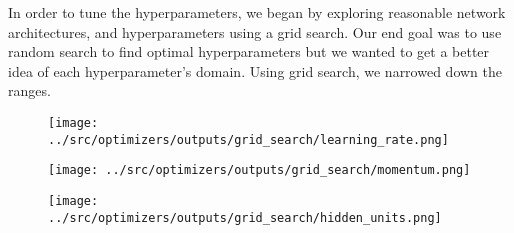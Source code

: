 In order to tune the hyperparameters, we began by exploring reasonable network architectures, and hyperparameters using a grid search.
Our end goal was to use random search to find optimal hyperparameters but we wanted to get a better idea of each hyperparameter's domain.
Using grid search, we narrowed down the ranges.


\begin{figure}[!ht]
  \centering
      {{\texttt{[image: ../src/optimizers/outputs/grid\_search/learning\_rate.png]}}}
\end{figure}

\begin{figure}[!ht]
  \centering
      {{\texttt{[image: ../src/optimizers/outputs/grid\_search/momentum.png]}}}
\end{figure}

\begin{figure}[!ht]
  \centering
      {{\texttt{[image: ../src/optimizers/outputs/grid\_search/hidden\_units.png]}}}
\end{figure}

